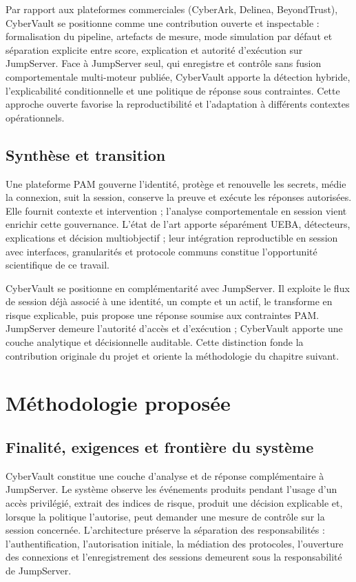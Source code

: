 \documentclass[11pt,a4paper,oneside]{report}
\theoremstyle{definition}
\theoremstyle{plain}
\begin{document}
Par rapport aux plateformes commerciales (CyberArk, Delinea, BeyondTrust), CyberVault se positionne comme une contribution ouverte et inspectable : formalisation du pipeline, artefacts de mesure, mode simulation par défaut et séparation explicite entre score, explication et autorité d'exécution sur JumpServer. Face à JumpServer seul, qui enregistre et contrôle sans fusion comportementale multi-moteur publiée, CyberVault apporte la détection hybride, l'explicabilité conditionnelle et une politique de réponse sous contraintes. Cette approche ouverte favorise la reproductibilité et l'adaptation à différents contextes opérationnels.

\section{Synthèse et transition}

Une plateforme PAM gouverne l'identité, protège et renouvelle les secrets, médie la connexion, suit la session, conserve la preuve et exécute les réponses autorisées. Elle fournit contexte et intervention ; l'analyse comportementale en session vient enrichir cette gouvernance. L'état de l'art apporte séparément UEBA, détecteurs, explications et décision multiobjectif ; leur intégration reproductible en session avec interfaces, granularités et protocole communs constitue l'opportunité scientifique de ce travail.

CyberVault se positionne en complémentarité avec JumpServer. Il exploite le flux de session déjà associé à une identité, un compte et un actif, le transforme en risque explicable, puis propose une réponse soumise aux contraintes PAM. JumpServer demeure l'autorité d'accès et d'exécution ; CyberVault apporte une couche analytique et décisionnelle auditable. Cette distinction fonde la contribution originale du projet et oriente la méthodologie du chapitre suivant.

\chapter{Méthodologie proposée}
\label{chap:method}

\section{Finalité, exigences et frontière du système}

CyberVault constitue une couche d'analyse et de réponse complémentaire à
JumpServer. Le système observe les événements produits pendant l'usage d'un
accès privilégié, extrait des indices de risque, produit une décision
explicable et, lorsque la politique l'autorise, peut demander une mesure de
contrôle sur la session concernée. L'architecture préserve la séparation des
responsabilités : l'authentification, l'autorisation initiale, la médiation des
protocoles, l'ouverture des connexions et l'enregistrement des sessions
demeurent sous la responsabilité de JumpServer.
\end{document}
